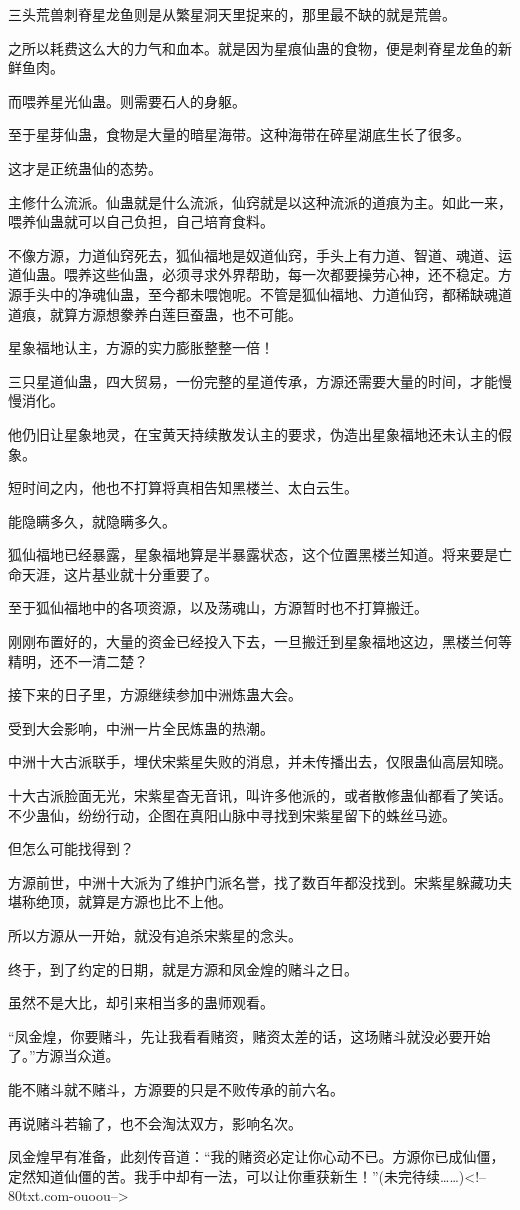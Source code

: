 \begin{this_body}
三头荒兽刺脊星龙鱼则是从繁星洞天里捉来的，那里最不缺的就是荒兽。

之所以耗费这么大的力气和血本。就是因为星痕仙蛊的食物，便是刺脊星龙鱼的新鲜鱼肉。

而喂养星光仙蛊。则需要石人的身躯。

至于星芽仙蛊，食物是大量的暗星海带。这种海带在碎星湖底生长了很多。

这才是正统蛊仙的态势。

主修什么流派。仙蛊就是什么流派，仙窍就是以这种流派的道痕为主。如此一来，喂养仙蛊就可以自己负担，自己培育食料。

不像方源，力道仙窍死去，狐仙福地是奴道仙窍，手头上有力道、智道、魂道、运道仙蛊。喂养这些仙蛊，必须寻求外界帮助，每一次都要操劳心神，还不稳定。方源手头中的净魂仙蛊，至今都未喂饱呢。不管是狐仙福地、力道仙窍，都稀缺魂道道痕，就算方源想豢养白莲巨蚕蛊，也不可能。

星象福地认主，方源的实力膨胀整整一倍！

三只星道仙蛊，四大贸易，一份完整的星道传承，方源还需要大量的时间，才能慢慢消化。

他仍旧让星象地灵，在宝黄天持续散发认主的要求，伪造出星象福地还未认主的假象。

短时间之内，他也不打算将真相告知黑楼兰、太白云生。

能隐瞒多久，就隐瞒多久。

狐仙福地已经暴露，星象福地算是半暴露状态，这个位置黑楼兰知道。将来要是亡命天涯，这片基业就十分重要了。

至于狐仙福地中的各项资源，以及荡魂山，方源暂时也不打算搬迁。

刚刚布置好的，大量的资金已经投入下去，一旦搬迁到星象福地这边，黑楼兰何等精明，还不一清二楚？

接下来的日子里，方源继续参加中洲炼蛊大会。

受到大会影响，中洲一片全民炼蛊的热潮。

中洲十大古派联手，埋伏宋紫星失败的消息，并未传播出去，仅限蛊仙高层知晓。

十大古派脸面无光，宋紫星杳无音讯，叫许多他派的，或者散修蛊仙都看了笑话。不少蛊仙，纷纷行动，企图在真阳山脉中寻找到宋紫星留下的蛛丝马迹。

但怎么可能找得到？

方源前世，中洲十大派为了维护门派名誉，找了数百年都没找到。宋紫星躲藏功夫堪称绝顶，就算是方源也比不上他。

所以方源从一开始，就没有追杀宋紫星的念头。

终于，到了约定的日期，就是方源和凤金煌的赌斗之日。

虽然不是大比，却引来相当多的蛊师观看。

“凤金煌，你要赌斗，先让我看看赌资，赌资太差的话，这场赌斗就没必要开始了。”方源当众道。

能不赌斗就不赌斗，方源要的只是不败传承的前六名。

再说赌斗若输了，也不会淘汰双方，影响名次。

凤金煌早有准备，此刻传音道：“我的赌资必定让你心动不已。方源你已成仙僵，定然知道仙僵的苦。我手中却有一法，可以让你重获新生！”(未完待续……)<!--80txt.com-ouoou-->

\end{this_body}

